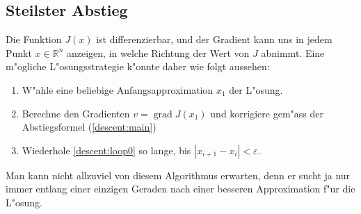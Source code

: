 \subsection{Steilster Abstieg}
Die Funktion $J(x)$ ist differenzierbar, und der Gradient kann uns in
jedem Punkt $x\in\mathbb R^n$ anzeigen, in welche Richtung der Wert
von $J$ abnimmt. Eine m"ogliche L"osungsstrategie k"onnte daher
wie folgt aussehen:
\begin{enumerate}
\item W"ahle eine beliebige Anfangsapproximation $x_1$ der L"osung.
\item \label{descent:loop0}
Berechne den Gradienten $v=\operatorname{grad}J(x_1)$ und
korrigiere gem"ass der Abstiegsformel (\ref{descent:main})
\item Wiederhole \ref{descent:loop0} so lange,
bis $|x_{i+1}-x_i|<\varepsilon$.
\end{enumerate}
Man kann nicht allzuviel von diesem Algorithmus erwarten,
denn er sucht ja nur immer entlang einer einzigen Geraden
nach einer besseren Approximation f"ur die L"osung.

